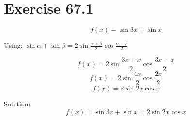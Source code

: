 \documentclass[a4paper, 10pt]{scrartcl}
\begin{document}
\section{Exercise 67.1}

\[f(x) = \sin{3x} + \sin{x}\]

Using: $\sin{\alpha} + \sin{\beta} = 2\sin{\frac{\alpha + \beta}{2}}\cos{\frac{\alpha - \beta}{2}}$

\[f(x) = 2\sin{\frac{3x + x}{2}}\cos{\frac{3x - x}{2}}\]
\[f(x) = 2\sin{\frac{4x}{2}}\cos{\frac{2x}{2}}\]
\[f(x) = 2\sin{2x}\cos{x}\]

Solution:
\[f(x) = \sin{3x} + \sin{x} = 2\sin{2x}\cos{x}\]
\end{document}
